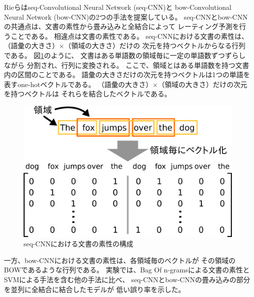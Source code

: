 Rieら\cite{rie14}はseq-Convolutional Neural Network (seq-CNN)と
bow-Convolutional Neural Network (bow-CNN)の2つの手法を提案している。
seq-CNNとbow-CNNの共通点は、文書の素性から畳み込み\nn と全結合\nn によって
レーティング予測を行うことである。
相違点は文書の素性である。
seq-CNNにおける文書の素性は、（語彙の大きさ）×（領域の大きさ）だけの
次元を持つベクトルからなる行列である。
図\ref{fig:SeqCNNTextFeature}のように、
文書はある単語数の領域毎に一定の単語数ずつずらしながら
分割され、行列に変換される。
ここで、領域とはある単語数を持つ文書内の区間のことである。
語彙の大きさだけの次元を持つベクトルは1つの単語を表すone-hotベクトルである。
（語彙の大きさ）×（領域の大きさ）だけの次元を持つベクトルは
それらを結合したベクトルである。
\begin{figure}
  \includegraphics{fig/seq_cnn_text_feature.pdf}
  \caption{seq-CNNにおける文書の素性の構成}
  \label{fig:SeqCNNTextFeature}
\end{figure}
一方、bow-CNNにおける文書の素性は、各領域毎のベクトルが
その領域のBOWであるような行列である。
実験では、Bag Of n-gramsによる文書の素性とSVMによる手法を含む他の手法に比べ、
seq-CNNとbow-CNNの畳み込み\nn の部分を並列に全結合\nn に結合したモデルが
低い誤り率を示した。

